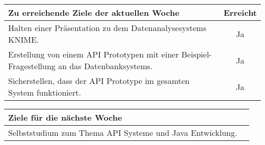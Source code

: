 \begin{tabularx}{\textwidth}{Xc}
    \arrayrulecolor{OliveGreen}
    \toprule
    {\bfseries Zu erreichende Ziele der aktuellen Woche} & {\bfseries Erreicht} \\
    \midrule[2pt]
    Halten einer Präsentation zu dem Datenanalysesystems KNIME. &Ja          \\
    \rowcolor{OliveGreen!15}
    Erstellung von einem API Prototypen mit einer Beispiel-Fragestellung an das
    Datenbanksystems. &Ja                                                    \\
    \rowcolor{White}
    Sicherstellen, dass der API Prototype im gesamten System funktioniert.  
    &Ja                                                                      \\
    \bottomrule[2pt]
\end{tabularx}
%
\vspace{1cm}
%
\begin{tabularx}{\textwidth}{Xc}
    \arrayrulecolor{OliveGreen}
    \toprule
    {\bfseries Ziele für die nächste Woche}              &                   \\
    \midrule[2pt]
    Selbststudium zum Thema API Systeme und Java Entwicklung. &              \\
\end{tabularx}

